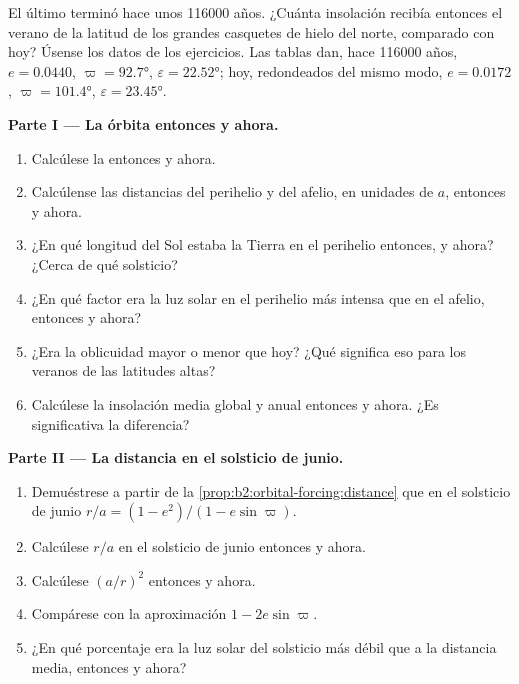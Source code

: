 \begin{problem}\label{pb:b2:orbital-forcing:1}
El último  terminó hace unos \num{116000} años. ¿Cuánta insolación recibía entonces el verano de la
latitud de los grandes casquetes de hielo del norte, comparado con hoy? Úsense los datos de los
ejercicios. Las tablas dan, hace \num{116000} años, $e = 0.0440$, $\varpi = \ang{92.7}$,
$\varepsilon = \ang{22.52}$; hoy, redondeados del mismo modo, $e = 0.0172$, $\varpi = \ang{101.4}$,
$\varepsilon = \ang{23.45}$.

\medskip\noindent\textbf{Parte I --- La órbita entonces y ahora.}
\begin{enumerate}
  \item Calcúlese la  entonces y ahora.
  \item Calcúlense las distancias del perihelio y del afelio, en unidades de $a$, entonces y ahora.
  \item ¿En qué longitud del Sol estaba la Tierra en el perihelio entonces, y ahora? ¿Cerca de qué solsticio?
  \item ¿En qué factor era la luz solar en el perihelio más intensa que en el afelio, entonces y ahora?
  \item ¿Era la oblicuidad mayor o menor que hoy? ¿Qué significa eso para los veranos de las
        latitudes altas?
  \item Calcúlese la insolación media global y anual entonces y ahora. ¿Es significativa la diferencia?
\end{enumerate}

\medskip\noindent\textbf{Parte II --- La distancia en el solsticio de junio.}
\begin{enumerate}[resume]
  \item Demuéstrese a partir de la \cref{prop:b2:orbital-forcing:distance} que en el solsticio de junio $r/a = (1 -
        e^2)/(1 - e\sin\varpi)$.
  \item Calcúlese $r/a$ en el solsticio de junio entonces y ahora.
  \item Calcúlese $(a/r)^2$ entonces y ahora.
  \item Compárese con la aproximación $1 - 2e\sin\varpi$.
  \item ¿En qué porcentaje era la luz solar del solsticio más débil que a la distancia media, entonces y ahora?
\end{enumerate}


\end{problem}
